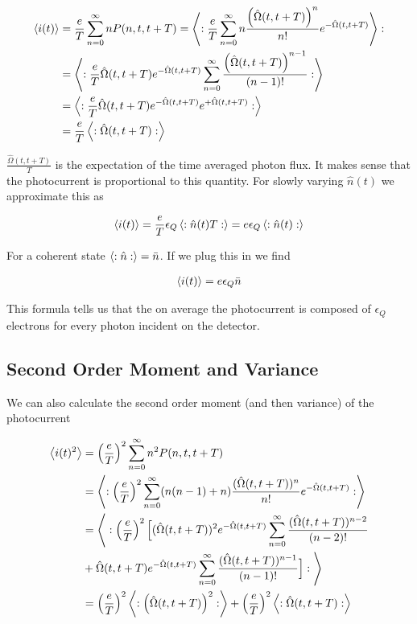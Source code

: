 \documentclass[12pt]{article}
\begin{document}
\begin{align}
\Braket{i(t)} &= \frac{e}{T} \sum_{n=0}^{\infty} n P(n,t,t+T) = \Braket{:\frac{e}{T} \sum_{n=0}^{\infty} n\frac{\left(\hat{\Omega}(t,t+T)\right)^n}{n!} e^{-\hat{\Omega}(t,t+T)}}:\\
&= \Braket{:\frac{e}{T} \hat{\Omega}(t,t+T) e^{-\hat{\Omega}(t,t+T)}\sum_{n=0}^{\infty} \frac{\left(\hat{\Omega}(t,t+T)\right)^{n-1}}{(n-1)!}:}\\
&= \Braket{:\frac{e}{T} \hat{\Omega}(t,t+T) e^{-\hat{\Omega}(t,t+T)} e^{+\hat{\Omega}(t,t+T)}:}\\
& = \frac{e}{T}\Braket{:\hat{\Omega}(t,t+T):}\\
\end{align}

$\frac{\hat{\Omega}(t,t+T)}{T}$ is the expectation of the time averaged photon flux. It makes sense that the photocurrent is proportional to this quantity. For slowly varying $\hat{n}(t)$ we approximate this as

\begin{align}
\Braket{i(t)} = \frac{e}{T} \epsilon_Q \Braket{:\hat{n}(t) T:} = e \epsilon_Q \Braket{:\hat{n}(t):}
\end{align}

 For a coherent state $\Braket{:\hat{n}:} = \bar{n}$. If we plug this in we find

\begin{align}
\Braket{i(t)} = e \epsilon_Q \bar{n}
\end{align}

This formula tells us that the on average the photocurrent is composed of $\epsilon_Q$ electrons for every photon incident on the detector.

\subsection{Second Order Moment and Variance}

We can also calculate the second order moment (and then variance) of the photocurrent

\begin{align}
\Braket{i(t)^2} &= \left(\frac{e}{T}\right)^2 \sum_{n=0}^{\infty} n^2 P(n,t,t+T)\\
&=\Braket{:\left(\frac{e}{T}\right)^2 \sum_{n=0}^{\infty} (n(n-1) + n) \frac{(\hat{\Omega}(t,t+T))^n}{n!} e^{-\hat{\Omega}(t,t+T)}:}\\
&= \Bigg \langle:\left(\frac{e}{T}\right)^2 \Big[(\hat{\Omega}(t,t+T))^2 e^{-\hat{\Omega}(t,t+T)} \sum_{n=0}^{\infty} \frac{(\hat{\Omega}(t,t+T))^{n-2}}{(n-2)!}\\
& + \hat{\Omega}(t,t+T) e^{-\hat{\Omega}(t,t+T)} \sum_{n=0}^{\infty} \frac{(\hat{\Omega}(t,t+T))^{n-1}}{(n-1)!}\Big]: \Bigg \rangle\\
&= \left(\frac{e}{T}\right)^2 \Braket{:\left(\hat{\Omega}(t,t+T)\right)^2:} + \left(\frac{e}{T}\right)^2 \Braket{:\hat{\Omega}(t,t+T):}
\end{align}
\end{document}
